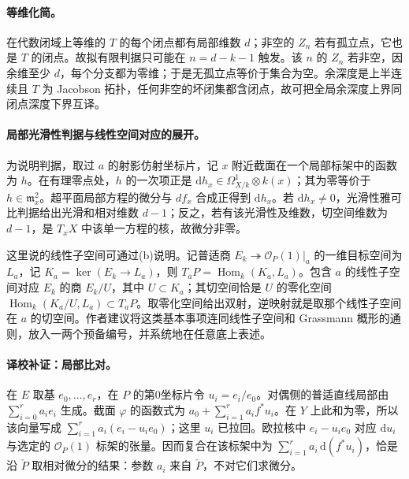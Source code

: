 \paragraph{等维化简。}
在代数闭域上等维的 $T$ 的每个闭点都有局部维数 $d$；非空的 $Z_n$ 若有孤立点，它也是 $T$ 的闭点。故拟有限判据只可能在 $n=d-k-1$ 触发。该 $n$ 的 $Z_n$ 若非空，因余维至少 $d$，每个分支都为零维；于是无孤立点等价于集合为空。余深度是上半连续且 $T$ 为 Jacobson 拓扑，任何非空的坏闭集都含闭点，故可把全局余深度上界同闭点深度下界互译。

\endgroup


\hypertarget{D18-104-notes}{}

\begingroup
\def\PP{\mathbb P}\def\OO{\mathcal O}\def\Ocal{\mathcal O}
\def\F{\mathcal F}\def\G{\mathcal G}\def\N{\mathcal N}
\def\PD{\check P}\def\Pdual{\check P}
\def\Ys{Y^{\mathrm{sing}}}\def\Ysing{Y^{\mathrm{sing}}}
\def\Ds{Y^{\mathrm{sup\,sing}}}\def\Ysup{Y^{\mathrm{sup\,sing}}}
\def\cod{\operatorname{codim}}\def\Sing{\operatorname{Sing}}
\def\depth{\operatorname{depth}}\def\coprof{\operatorname{coprof}}
\def\Ass{\operatorname{Ass}}\def\Supp{\operatorname{Supp}}
\def\Gr{\operatorname{Gr}}\def\Spec{\operatorname{Spec}}\def\Proj{\operatorname{Proj}}


\paragraph{局部光滑性判据与线性空间对应的展开。}
为说明判据，取过 $a$ 的射影仿射坐标片，记 $x$ 附近截面在一个局部标架中的函数为 $h$。在有理零点处，$h$ 的一次项正是 $\mathrm dh_x\in\Omega^1_{X/k}\otimes k(x)$；其为零等价于 $h\in\mathfrak m_x^2$。超平面局部方程的微分与 $df_x$ 合成正得到 $\mathrm dh_x$。若 $\mathrm dh_x\ne0$，光滑性雅可比判据给出光滑和相对维数 $d-1$；反之，若有该光滑性及维数，切空间维数为 $d-1$，是 $T_xX$ 中该单一方程的核，故微分非零。

这里说的线性子空间可通过(b)说明。记普适商 $E_k\twoheadrightarrow\Ocal_P(1)|_a$ 的一维目标空间为 $L_a$，记 $K_a=\ker(E_k\to L_a)$，则 $T_aP=\operatorname{Hom}_k(K_a,L_a)$。包含 $a$ 的线性子空间对应 $E_k$ 的商 $E_k/U$，其中 $U\subset K_a$；其切空间恰是 $U$ 的零化空间 $\operatorname{Hom}_k(K_a/U,L_a)\subset T_aP$。取零化空间给出双射，逆映射就是取那个线性子空间在 $a$ 的切空间。作者建议将这类基本事项连同线性子空间和 Grassmann 概形的通则，放入一两个预备编号，并系统地在任意底上表述。

\paragraph{译校补证：局部比对。}
在 $E$ 取基 $e_0,\ldots,e_r$，在 $P$ 的第0坐标片令 $u_i=e_i/e_0$。对偶侧的普适直线局部由 $\sum_{i=0}^r a_i e_i$ 生成。截面 $\varphi$ 的函数式为 $a_0+\sum_{i=1}^r a_i f^*u_i$。在 $Y$ 上此和为零，所以该向量写成 $\sum_{i=1}^r a_i(e_i-u_i e_0)$；这里 $u_i$ 已拉回。欧拉核中 $e_i-u_i e_0$ 对应 $\mathrm du_i$ 与选定的 $\Ocal_P(1)$ 标架的张量。因而复合在该标架中为 $\sum_{i=1}^r a_i\,\mathrm d(f^*u_i)$，恰是沿 $\Pdual$ 取相对微分的结果：参数 $a_i$ 来自 $\Pdual$，不对它们求微分。

